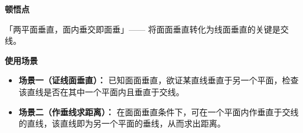 \begin{explanationbox}
	\medskip
	\textbf{\textcolor{CExplanation}{顿悟点}}

	「两平面垂直，面内垂交即面垂」—— 将面面垂直转化为线面垂直的关键是交线。

	\medskip
	\textbf{\textcolor{CExplanation}{使用场景}}
	\begin{itemize}[leftmargin=*, itemsep=0.5em, topsep=0.4em]
		\item \textbf{场景一（证线面垂直）：} 已知面面垂直，欲证某直线垂直于另一个平面，检查该直线是否在其中一个平面内且垂直于交线。
		\item \textbf{场景二（作垂线求距离）：} 在面面垂直条件下，可在一个平面内作垂直于交线的直线，该直线即为另一个平面的垂线，从而求出距离。
	\end{itemize}
\end{explanationbox}
